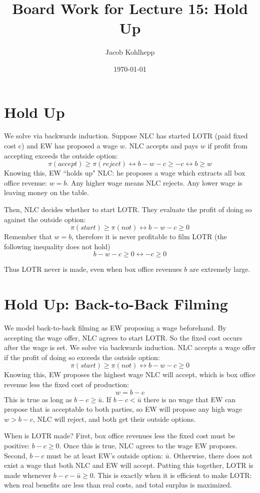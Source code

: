 \documentclass{article}
\title{Board Work for Lecture 15: Hold Up}
\author{Jacob Kohlhepp}
\date{\today}
\begin{document}
\maketitle

\section{Hold Up}
%

We solve via backwards induction. Suppose NLC has started LOTR (paid fixed cost c) and EW has proposed a wage $w$. NLC accepts and pays $w$ if profit from accepting exceeds the outside option:
\[ \pi(accept) \geq \pi (reject) \leftrightarrow b-w-c \geq -c \leftrightarrow b \geq w\]
Knowing this, EW ``holds up" NLC: he proposes a wage which extracts all box office revenue: $w=b$. Any higher wage means NLC rejects. Any lower wage is leaving money on the table. 

Then, NLC decides whether to start LOTR. They evaluate the profit of doing so against the outside option:
\[\pi(start) \geq \pi (not) \leftrightarrow  b-w-c \geq 0\]
Remember that $w=b$, therefore it is never profitable to film LOTR (the following inequality does not hold)
\[b-w-c \geq 0 \leftrightarrow -c \geq 0 \]

Thus LOTR never is made, even when box office revenues $b$ are extremely large.

\section{Hold Up: Back-to-Back Filming}
%

We model back-to-back filming as EW proposing a wage beforehand. By accepting the wage offer, NLC agrees to start LOTR. So the fixed cost occurs after the wage is set. We solve via backwards induction. NLC accepts a wage offer if the profit of doing so exceeds the outside option:
\[\pi(start) \geq \pi (not) \leftrightarrow  b-w-c \geq 0\]
Knowing this, EW proposes the highest wage NLC will accept, which is box office revenue less the fixed cost of production:
\[w = b-c\]
This is true as long as $b-c\geq \bar u$. If $b-c<\bar u$ there is no wage that EW can propose that is acceptable to both parties, so EW will propose any high wage $w>b-c$, NLC will reject, and both get their outside options.

When is LOTR made? First, box office revenues less the fixed cost must be positive: $b-c\geq 0$. Once this is true, NLC agrees to the wage EW proposes. Second, $b-c$ must be at least EW's outside option: $\bar u$. Otherwise, there does not exist a wage that both NLC and EW will accept. Putting this together, LOTR is made whenever $b-c-\bar u\geq 0$. This is exactly when it is efficient to make LOTR: when real benefits are less than real costs, and total surplus is maximized.
\end{document}
